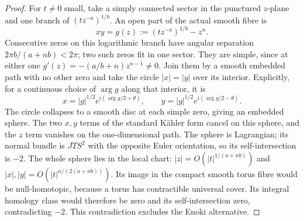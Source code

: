 \begin{proof}
For $t\ne0$ small, take a simply connected
sector in the punctured $z$-plane and one
branch of $(t z^{-a})^{1/b}$. An open part
of the actual smooth fibre is
\[
 xy=g(z):=(t z^{-a})^{1/b}-z^n.
 \tag{C.INT.13}\label{cdp:eq:C.INT.13}
\]
Consecutive zeros on this logarithmic branch
have angular separation $2\pi b/(a+nb)<2\pi$;
two such zeros fit in one sector. They are
simple, since at either one
$g'(z)=-(a/b+n)z^{n-1}\ne0$.
Join them by a smooth embedded path with no
other zero and take the circle $|x|=|y|$
over its interior. Explicitly, for a continuous
choice of $\arg g$ along that interior, it is
\[
 x=|g|^{1/2}e^{i(\arg g/2+\theta)},\qquad
 y=|g|^{1/2}e^{i(\arg g/2-\theta)}.
 \tag{C.INT.14}\label{cdp:eq:C.INT.14}
\]
The circle collapses to a smooth disc at each
simple zero, giving an embedded sphere.
The two $x,y$ terms of the standard K\"ahler
form cancel on this sphere, and the $z$ term
vanishes on the one-dimensional path. The
sphere is Lagrangian; its normal bundle is
$JTS^2$ with the opposite Euler orientation,
so its self-intersection is $-2$.
The whole sphere lies in the local chart:
$|z|=O(|t|^{1/(a+nb)})$ and
$|x|,|y|=O(|t|^{n/(2(a+nb))})$.
Its image in the compact smooth torus fibre
would be null-homotopic, because a torus has
contractible universal cover. Its integral
homology class would therefore be zero and
its self-intersection zero, contradicting
$-2$. This contradiction excludes the Enoki
alternative.
\end{proof}



